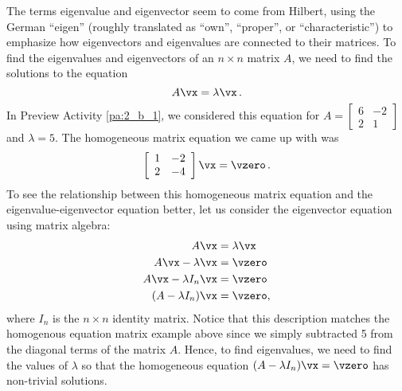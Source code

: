 The terms eigenvalue and eigenvector seem to come from Hilbert, using the German ``eigen'' (roughly translated as ``own'', ``proper'', or ``characteristic'') to emphasize how eigenvectors and eigenvalues are connected to their matrices. To find the eigenvalues and eigenvectors of an $n \times n$ matrix $A$, we need to find the solutions to the equation
\[A \vx = \lambda \vx \, .\]
In Preview Activity \ref{pa:2_b_1}, we considered this equation for $A=\left[ \begin{array}{cr} 6&-2 \\ 2&1 \end{array} \right]$ and $\lambda=5$. The homogeneous matrix equation we came up with was
\[ \left[ \begin{array}{cr} 1&-2 \\ 2&-4 \end{array}\right] \vx = \vzero \,.\]
To see the relationship between this homogeneous matrix equation and the eigenvalue-eigenvector equation better, let us consider the eigenvector equation using matrix algebra:
\begin{align*}
A\vx &= \lambda\vx \\
A\vx - \lambda \vx &= \vzero \\
A\vx - \lambda I_n\vx &= \vzero \\
(A-\lambda I_n)\vx &= \vzero,
\end{align*}
where $I_n$ is the $n \times n$ identity matrix. Notice that this description matches the homogenous equation matrix example above since we simply subtracted 5 from the diagonal terms of the matrix $A$. Hence, to find eigenvalues, we need to find the values of $\lambda$ so that the homogeneous equation $(A - \lambda I_n)\vx=\vzero$ has non-trivial solutions.



